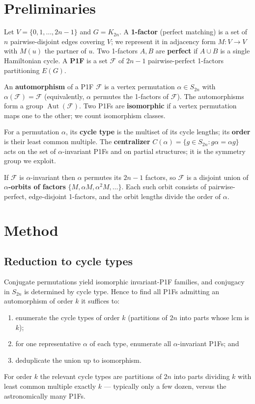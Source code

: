 \documentclass[11pt,reqno]{amsart}
\theoremstyle{plain}
\theoremstyle{definition}
\numberwithin{theorem}{section}
\newcommand{\Aut}{\operatorname{Aut}}
\begin{document}
\section{Preliminaries}

Let $V=\{0,1,\dots,2n-1\}$ and $G=K_{2n}$. A \textbf{1-factor} (perfect matching) is a set
of $n$ pairwise-disjoint edges covering $V$; we represent it in adjacency form
$M:V\to V$ with $M(u)$ the partner of $u$. Two 1-factors $A,B$ are \textbf{perfect} if
$A\cup B$ is a single Hamiltonian cycle. A \textbf{P1F} is a set $\mathcal F$ of $2n-1$
pairwise-perfect 1-factors partitioning $E(G)$.

An \textbf{automorphism} of a P1F $\mathcal F$ is a vertex permutation $\alpha\in S_{2n}$
with $\alpha(\mathcal F)=\mathcal F$ (equivalently, $\alpha$ permutes the 1-factors of
$\mathcal F$). The automorphisms form a group $\Aut(\mathcal F)$. Two P1Fs are
\textbf{isomorphic} if a vertex permutation maps one to the other; we count isomorphism
classes.

For a permutation $\alpha$, its \textbf{cycle type} is the multiset of its cycle lengths;
its \textbf{order} is their least common multiple. The \textbf{centralizer}
$C(\alpha)=\{g\in S_{2n}: g\alpha=\alpha g\}$ acts on the set of $\alpha$-invariant
P1Fs and on partial structures; it is the symmetry group we exploit.

If $\mathcal F$ is $\alpha$-invariant then $\alpha$ permutes its $2n-1$ factors, so
$\mathcal F$ is a disjoint union of \textbf{$\alpha$-orbits of factors}
$\{M,\alpha M,\alpha^2M,\dots\}$. Each such orbit consists of pairwise-perfect,
edge-disjoint 1-factors, and the orbit lengths divide the order of $\alpha$.

\section{Method}

\subsection{Reduction to cycle types}

Conjugate permutations yield isomorphic invariant-P1F families, and conjugacy in
$S_{2n}$ is determined by cycle type. Hence to find all P1Fs admitting an
automorphism of order $k$ it suffices to:
\begin{enumerate}
\item enumerate the cycle types of order $k$ (partitions of $2n$ into parts whose lcm
is $k$);
\item for one representative $\alpha$ of each type, enumerate all $\alpha$-invariant
P1Fs; and
\item deduplicate the union up to isomorphism.
\end{enumerate}
For order $k$ the relevant cycle types are partitions of $2n$ into parts dividing
$k$ with least common multiple exactly $k$ --- typically only a few dozen, versus the
astronomically many P1Fs.
\end{document}
